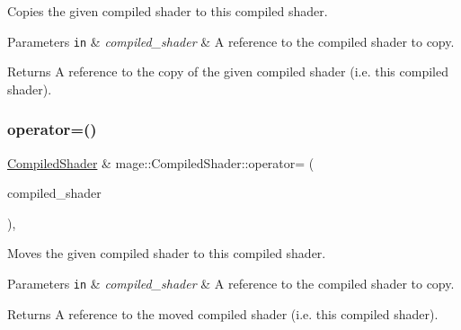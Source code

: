 Copies the given compiled shader to this compiled shader.


\begin{DoxyParams}[1]{Parameters}
\mbox{\tt in}  & {\em compiled\+\_\+shader} & A reference to the compiled shader to copy. \\
\hline
\end{DoxyParams}
\begin{DoxyReturn}{Returns}
A reference to the copy of the given compiled shader (i.\+e. this compiled shader). 
\end{DoxyReturn}
\hypertarget{classmage_1_1_compiled_shader_abfa97b056d6e9f0f475c8b231c4cab96}{}\label{classmage_1_1_compiled_shader_abfa97b056d6e9f0f475c8b231c4cab96} 
\subsubsection{\texorpdfstring{operator=()}{operator=()}\hspace{0.1cm}{\footnotesize\ttfamily [2/2]}}
{\footnotesize\ttfamily \hyperlink{classmage_1_1_compiled_shader}{Compiled\+Shader} \& mage\+::\+Compiled\+Shader\+::operator= (\begin{DoxyParamCaption}\item[{\hyperlink{classmage_1_1_compiled_shader}{Compiled\+Shader} \&\&}]{compiled\+\_\+shader }\end{DoxyParamCaption})\hspace{0.3cm}{\ttfamily [default]}, {\ttfamily [noexcept]}}

Moves the given compiled shader to this compiled shader.


\begin{DoxyParams}[1]{Parameters}
\mbox{\tt in}  & {\em compiled\+\_\+shader} & A reference to the compiled shader to copy. \\
\hline
\end{DoxyParams}
\begin{DoxyReturn}{Returns}
A reference to the moved compiled shader (i.\+e. this compiled shader). 
\end{DoxyReturn}

